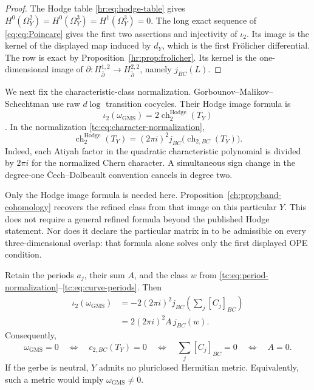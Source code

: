 \begin{proof}
The Hodge table \eqref{hr:eq:hodge-table} gives
$H^0(\Omega_Y^2)=H^0(\Omega_Y^3)=H^1(\Omega_Y^3)=0$.
The long exact sequence of \eqref{cq:eq:Poincare} gives the
first two assertions and injectivity of $\iota_2$.
Its image is the kernel of the displayed map induced by $d_Y$,
which is the first Fr\"olicher differential.
The row is exact by Proposition~\ref{hr:prop:frolicher}.
Its kernel is the one-dimensional image of
$\partial:H_{\bar\partial}^{1,2}\to H_{\bar\partial}^{2,2}$,
namely $j_{BC}(L)$.
\end{proof}

We next fix the characteristic-class normalization.
Gorbounov--Malikov--Schechtman use raw $d\log$ transition
cocycles. Their Hodge image formula is
\begin{equation}\label{ch:eq:published-image}
       \iota_2(\omega_{\mathrm{GMS}})
                    =2\operatorname{ch}^{\mathrm{Hodge}}_2(T_Y)
\end{equation}
\cite[Claim~3.1 and Theorem~6.2]{GMSGerbes}.
In the normalization \eqref{tc:eq:character-normalization},
\begin{equation}\label{ch:eq:normalization-comparison}
 \operatorname{ch}^{\mathrm{Hodge}}_2(T_Y)
       =(2\pi i)^2j_{BC}\bigl(\operatorname{ch}_{2,BC}(T_Y)\bigr).
\end{equation}
Indeed, each Atiyah factor in the quadratic characteristic
polynomial is divided by $2\pi i$ for the normalized Chern
character. A simultaneous sign change in the degree-one
\v{C}ech--Dolbeault convention cancels in degree two.

Only the Hodge image formula is needed here.
Proposition~\ref{ch:prop:band-cohomology} recovers the refined
class from that image on this particular $Y$.
This does not require a general refined formula beyond the
published Hodge statement.
Nor does it declare the particular matrix in
\cite[equation~(5.3)]{GMSGerbes} to be admissible on every
three-dimensional overlap: that formula alone solves only the
first displayed OPE condition.

\begin{theorem}\label{ch:thm:curve-criterion}
Retain the periods $a_j$, their sum $A$, and the class $w$
from \eqref{tc:eq:period-normalization}--\eqref{tc:eq:curve-periods}.
Then
\begin{equation}\label{ch:eq:curve-image}
 \begin{aligned}
 \iota_2(\omega_{\mathrm{GMS}})
   &=-2(2\pi i)^2j_{BC}\!\left(\sum_j[C_j]_{BC}\right)\\
   &=2(2\pi i)^2 A\,j_{BC}(w).
 \end{aligned}
\end{equation}
Consequently,
\begin{equation}\label{ch:eq:neutrality-criterion}
 \omega_{\mathrm{GMS}}=0
 \quad\Longleftrightarrow\quad c_{2,BC}(T_Y)=0
 \quad\Longleftrightarrow\quad \sum_j[C_j]_{BC}=0
 \quad\Longleftrightarrow\quad A=0.
\end{equation}
If the gerbe is neutral, $Y$ admits no pluriclosed Hermitian
metric. Equivalently, such a metric would imply
$\omega_{\mathrm{GMS}}\ne0$.
\end{theorem}

